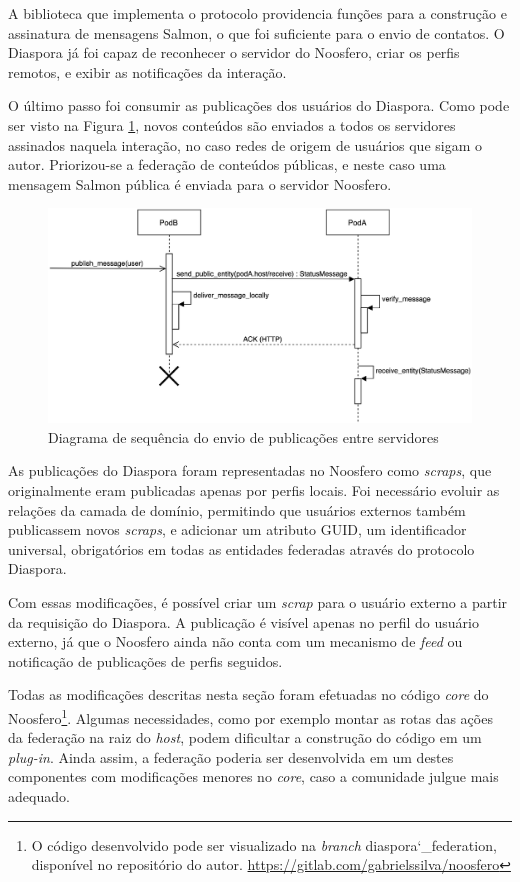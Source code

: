 A biblioteca que implementa o protocolo providencia funções para a construção e
assinatura de mensagens Salmon, o que foi suficiente para o envio de contatos. O
Diaspora já foi capaz de reconhecer o servidor do Noosfero, criar os perfis remotos,
e exibir as notificações da interação.

O último passo foi consumir as publicações dos usuários do Diaspora. Como pode ser
visto na Figura \ref{fig:seq_publicacao}, novos conteúdos são enviados a todos os
servidores assinados naquela interação, no caso redes de origem de usuários que
sigam o autor. Priorizou-se a federação de conteúdos públicas, e neste caso uma
mensagem Salmon pública é enviada para o servidor Noosfero.

\begin{figure}[h]
	\centering
		\includegraphics[keepaspectratio=true,scale=0.5]{figuras/seq_publicacao.eps}
	\caption{Diagrama de sequência do envio de publicações entre servidores}
	\label{fig:seq_publicacao}
\end{figure}

As publicações do Diaspora foram representadas no Noosfero como \textit{scraps}, que
originalmente eram publicadas apenas por perfis locais. Foi necessário evoluir as
relações da camada de domínio, permitindo que usuários externos também publicassem
novos \textit{scraps}, e adicionar um atributo GUID, um identificador universal,
obrigatórios em todas as entidades federadas através do protocolo Diaspora.

Com essas modificações, é possível criar um \textit{scrap} para o usuário externo a
partir da requisição do Diaspora. A publicação é visível apenas no perfil do usuário
externo, já que o Noosfero ainda não conta com um mecanismo de \textit{feed} ou
notificação de publicações de perfis seguidos.

Todas as modificações descritas nesta seção foram efetuadas no código \textit{core}
do Noosfero\footnote{O código desenvolvido pode ser visualizado na \textit{branch}
diaspora\char`_federation, disponível no repositório do autor.
\url{https://gitlab.com/gabrielssilva/noosfero}}. Algumas necessidades, como por
exemplo montar as rotas das ações da federação na raiz do \textit{host}, podem
dificultar a construção do código em um \textit{plug-in}. Ainda assim, a federação
poderia ser desenvolvida em um destes componentes com modificações menores no
\textit{core}, caso a comunidade julgue mais adequado.
